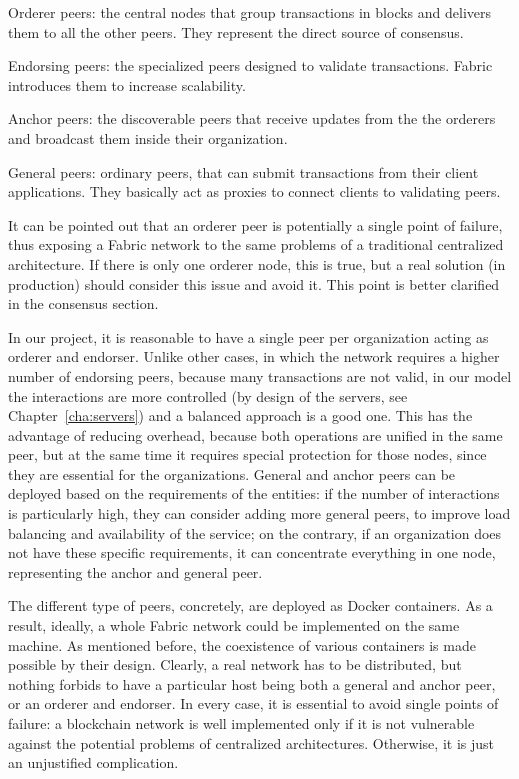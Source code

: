 \begin{description}
    \item Orderer peers: the central nodes that group transactions in blocks and delivers them to all the other peers. They represent the direct source of consensus.
    \item Endorsing peers: the specialized peers designed to validate transactions. Fabric introduces them to increase scalability.
    \item Anchor peers: the discoverable peers that receive updates from the the orderers and broadcast them inside their organization.
    \item General peers: ordinary peers, that can submit transactions from their client applications. They basically act as proxies to connect clients to validating peers.
\end{description}

It can be pointed out that an orderer peer is potentially a single point of failure, thus exposing a Fabric network to the same problems of a traditional centralized architecture. If there is only one orderer node, this is true, but a real solution (in production) should consider this issue and avoid it. This point is better clarified in the consensus section.

In our project, it is reasonable to have a single peer per organization acting as orderer and endorser. Unlike other cases, in which the network requires a higher number of endorsing peers, because many transactions are not valid, in our model the interactions are more controlled (by design of the servers, see Chapter~\ref{cha:servers}) and a balanced approach is a good one. This has the advantage of reducing overhead, because both operations are unified in the same peer, but at the same time it requires special protection for those nodes, since they are essential for the organizations. General and anchor peers can be deployed based on the requirements of the entities: if the number of interactions is particularly high, they can consider adding more general peers, to improve load balancing and availability of the service; on the contrary, if an organization does not have these specific requirements, it can concentrate everything in one node, representing the anchor and general peer.

The different type of peers, concretely, are deployed as Docker containers. As a result, ideally, a whole Fabric network could be implemented on the same machine. As mentioned before, the coexistence of various containers is made possible by their design. Clearly, a real network has to be distributed, but nothing forbids to have a particular host being both a general and anchor peer, or an orderer and endorser. In every case, it is essential to avoid single points of failure: a blockchain network is well implemented only if it is not vulnerable against the potential problems of centralized architectures. Otherwise, it is just an unjustified complication.

